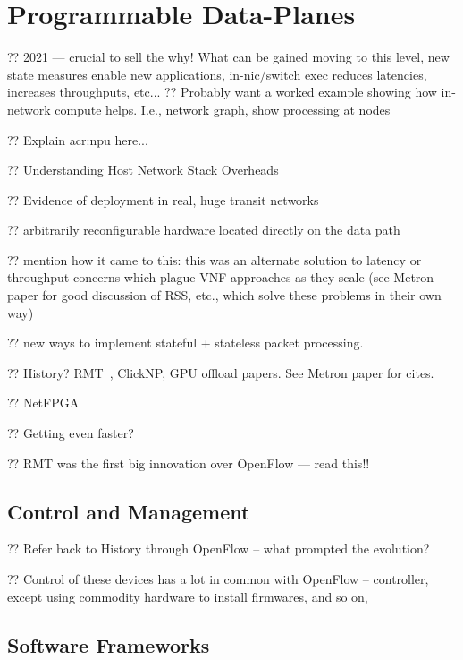 \chapter{Programmable Data-Planes}

?? 2021 --- crucial to sell the why! What can be gained moving to this level, new state measures enable new applications, in-nic/switch exec reduces latencies, increases throughputs, etc...
?? Probably want a worked example showing how in-network compute helps. I.e., network graph, show processing at nodes

?? Explain \gls{acr:npu} here...

?? Understanding Host Network Stack Overheads~\parencite{DBLP:conf/sigcomm/CaiCVH021}

?? Evidence of deployment in real, huge transit networks~

?? arbitrarily reconfigurable hardware located directly on the data path

?? mention how it came to this: this was an alternate solution to latency or throughput concerns which plague VNF approaches as they scale (see Metron paper for good discussion of RSS, etc., which solve these problems in their own way)

?? new ways to implement stateful + stateless packet processing.

?? History? RMT~\parencite{DBLP:conf/sigcomm/BosshartGKVMIMH13}, ClickNP, GPU offload papers. See Metron paper for cites.

?? NetFPGA~\parencite{DBLP:conf/fpga/IbanezBMZ19}

?? Getting even faster?~\parencite{nokia-fp5}


?? RMT was the first big innovation over OpenFlow --- read this!!

\section{Control and Management}

?? Refer back to History through OpenFlow -- what prompted the evolution?

?? Control of these devices has a lot in common with OpenFlow -- controller, except using commodity hardware to install firmwares, and so on,

\section{Software Frameworks}

